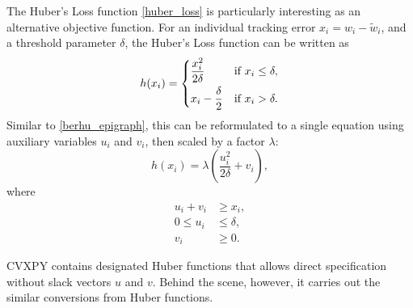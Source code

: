 \documentclass[11pt, letterpaper]{article}
\begin{document}
The Huber's Loss function \eqref{huber_loss} is particularly interesting as an alternative objective function. For an individual tracking error $x_i = w_i - \tilde{w}_i$, and a threshold parameter $\delta$, the
Huber's Loss function can be written as
\begin{equation*}
    h(x_i) = \begin{dcases}
        \frac{x_i^2}{2\delta} & \text{if } x_i \leq \delta, \\
        x_i - \frac{\delta}{2} & \text{if } x_i > \delta.
    \end{dcases}
\end{equation*}
Similar to \eqref{berhu_epigraph}, this can be reformulated to a single equation using auxiliary
variables $u_i$ and $v_i$, then scaled by a factor $\lambda$:
\begin{equation}
	\label{huber_loss_deviation_epigraph}
	h(x_i) = \lambda\left(\frac{u_i^2}{2\delta} + v_i\right),
\end{equation}
where
\begin{align*}
    u_i + v_i &\geq x_i,\\
	0 \leq u_i &\leq \delta, \\
	v_i &\geq 0.
\end{align*}




CVXPY \cite{cvxpy} contains designated Huber functions that allows direct specification without slack vectors $u$ and $v$. Behind the scene, however, it carries out the similar conversions from Huber functions.
\end{document}
